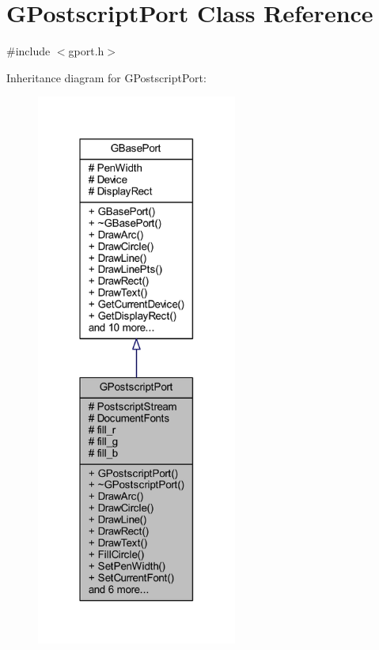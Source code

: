 \hypertarget{class_g_postscript_port}{}\section{G\+Postscript\+Port Class Reference}
\label{class_g_postscript_port}


{\ttfamily \#include $<$gport.\+h$>$}



Inheritance diagram for G\+Postscript\+Port\+:\nopagebreak
\begin{figure}[H]
\begin{center}
\leavevmode
\includegraphics[width=187pt]{class_g_postscript_port__inherit__graph}
\end{center}
\end{figure}


